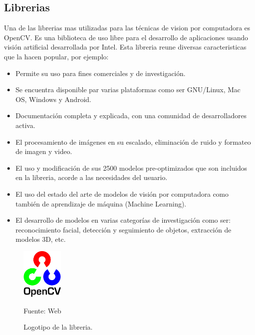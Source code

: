 \subsection{Librerias}
Una de las librerias mas utilizadas para las técnicas de vision por computadora es OpenCV. Es una biblioteca de uso libre para el desarrollo de aplicaciones usando visión artificial desarrollada por Intel. Esta libreria reune diversas caracteristicas que la hacen popular, por ejemplo: 
\begin{itemize}
    \item Permite su uso para fines comerciales y de investigación.
    \item Se encuentra disponible par varias plataformas como ser GNU/Linux, Mac OS, Windows y Android.
    \item Documentación completa y explicada, con una comunidad de desarrolladores activa.
    \item El procesamiento de imágenes en su escalado, eliminación de ruido y formateo de imagen y video.
    \item El uso y modificación de sus 2500 modelos pre-optimizados que son incluidos en la libreria, acorde a las necesidades del usuario.
    \item El uso del estado del arte de modelos de visión por computadora como también de aprendizaje de máquina (Machine Learning).
    \item El desarrollo de modelos en varias categorías de investigación como ser: reconocimiento facial, detección y seguimiento de objetos, extracción de modelos 3D, etc.
\end{itemize}

\begin{figure}[H]
    \begin{center}
        \includegraphics[width=2cm]{img/capitulo_2/cv2_logo.png}
    \end{center}
    \begin{center}
        \caption{Logotipo de la libreria.}
        Fuente: Web
        \label{fig:cv2_logo}    
    \end{center}
\end{figure}


